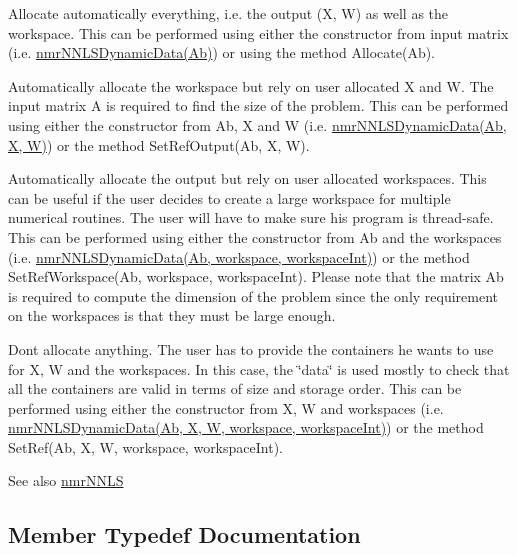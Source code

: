 \begin{DoxyItemize}
\item Allocate automatically everything, i.\+e. the output (X, W) as well as the workspace. This can be performed using either the constructor from input matrix (i.\+e. \hyperlink{classnmr_n_n_l_s_dynamic_data}{nmr\+N\+N\+L\+S\+Dynamic\+Data(\+Ab)}) or using the method Allocate(\+Ab).
\item Automatically allocate the workspace but rely on user allocated X and W. The input matrix A is required to find the size of the problem. This can be performed using either the constructor from Ab, X and W (i.\+e. \hyperlink{classnmr_n_n_l_s_dynamic_data}{nmr\+N\+N\+L\+S\+Dynamic\+Data(\+Ab, X, W)}) or the method Set\+Ref\+Output(\+Ab, X, W).
\item Automatically allocate the output but rely on user allocated workspaces. This can be useful if the user decides to create a large workspace for multiple numerical routines. The user will have to make sure his program is thread-\/safe. This can be performed using either the constructor from Ab and the workspaces (i.\+e. \hyperlink{classnmr_n_n_l_s_dynamic_data}{nmr\+N\+N\+L\+S\+Dynamic\+Data(\+Ab, workspace, workspace\+Int)}) or the method Set\+Ref\+Workspace(\+Ab, workspace, workspace\+Int). Please note that the matrix Ab is required to compute the dimension of the problem since the only requirement on the workspaces is that they must be large enough.
\item Don\textquotesingle{}t allocate anything. The user has to provide the containers he wants to use for X, W and the workspaces. In this case, the \char`\"{}data\char`\"{} is used mostly to check that all the containers are valid in terms of size and storage order. This can be performed using either the constructor from X, W and workspaces (i.\+e. \hyperlink{classnmr_n_n_l_s_dynamic_data}{nmr\+N\+N\+L\+S\+Dynamic\+Data(\+Ab, X, W, workspace, workspace\+Int)}) or the method Set\+Ref(\+Ab, X, W, workspace, workspace\+Int).
\end{DoxyItemize}

\begin{DoxySeeAlso}{See also}
\hyperlink{nmr_n_n_l_s_8h_afd1108e6bc3e5d308f34bc7b31fd3278}{nmr\+N\+N\+L\+S} 
\end{DoxySeeAlso}


\subsection{Member Typedef Documentation}
\hypertarget{classnmr_n_n_l_s_dynamic_data_ab99da17071a513448294ee9a420eb4e0}{}
